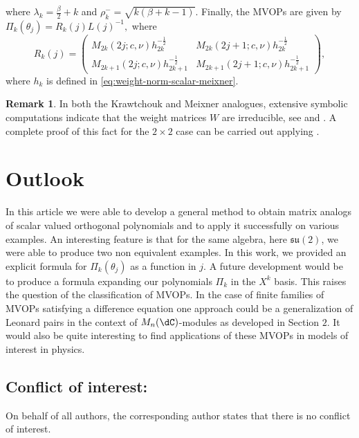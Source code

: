 \documentclass[a4paper,reqno]{amsart}
\theoremstyle{definition}
\newtheorem{remark}[theorem]{Remark}
\numberwithin{equation}{section}
\begin{document}
where $
\lambda_k=\frac{\beta}{2}+k$ and $ \rho^-_k=\sqrt{k(\beta+k-1)}$.
Finally, the MVOPs are given by $\Pi_k(\theta_j)=R_k(j)L(j)^{-1},$ where
\begin{equation}
    R_k(j)=\begin{pmatrix}
M_{2k}(2j;c,\nu)h_{2k}^{-\frac{1}{2}}&M_{2k}(2j+1;c,\nu)h_{2k}^{-\frac{1}{2}}\\
M_{2k+1}(2j;c,\nu)h_{2k+1}^{-\frac{1}{2}}&M_{2k+1}(2j+1;c,\nu)h_{2k+1}^{-\frac{1}{2}}
\end{pmatrix},
\end{equation}
where $h_k$ is defined in \eqref{eq:weight-norm-scalar-meixner}.

\begin{remark}
In both the Krawtchouk and Meixner analogues, extensive symbolic computations indicate that the weight matrices $W$ are
irreducible, see \cite{TZreducibility} and \cite{KRreducibility}. A complete proof of this fact for the $2\times2$ case can be carried out applying \cite[Theorem 2.3]{TZreducibility}.
\end{remark}
\section{Outlook}
In this article we were able to develop a general method to obtain matrix analogs of scalar valued orthogonal polynomials and to apply it successfully on various examples. An interesting feature is that for the same algebra, here $\mathfrak{su}(2)$, we were able to produce two non equivalent examples. In this work, we provided an explicit formula for $\Pi_k(\theta_j)$ as a function in $j$. A future development would be to produce a formula expanding our polynomials $\Pi_k$ in the $X^k$ basis. This raises the question of the classification of MVOPs. In the case of finite families of MVOPs satisfying a difference equation one approach could be a generalization of Leonard pairs in the context of $M_n(\dC)$-modules as developed in Section $2$. It would also be quite interesting to find applications of these MVOPs in models of interest in physics.



\subsection*{Conflict of interest:} On behalf of all authors, the corresponding author states that there is no conflict of interest.
\end{document}
